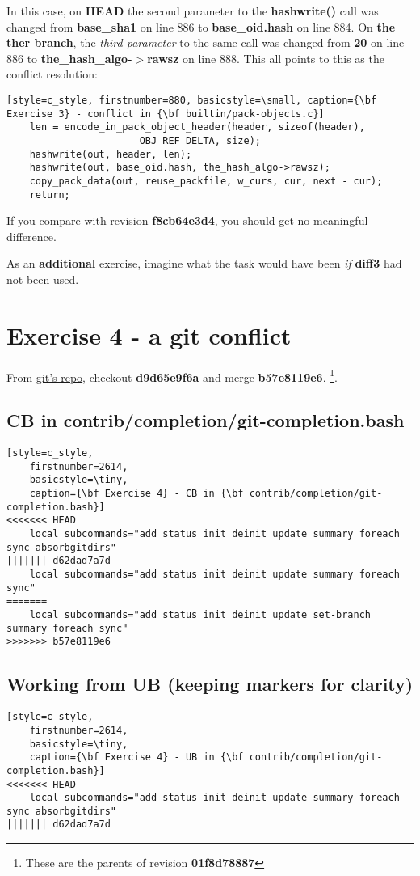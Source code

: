 In this case, on {\bf HEAD} the second parameter to the {\bf hashwrite()} call was changed from {\bf base\_sha1} on
line 886 to {\bf base\_oid.hash} on line 884. On {\bf the ther branch}, the {\it third parameter} to the same call was
changed from {\bf 20} on line 886 to {\bf the\_hash\_algo-$>$rawsz} on line 888. This all points to this as the conflict
resolution:

\begin{lstlisting}[style=c_style, firstnumber=880, basicstyle=\small, caption={\bf Exercise 3} - conflict in {\bf builtin/pack-objects.c}]
	len = encode_in_pack_object_header(header, sizeof(header),
					   OBJ_REF_DELTA, size);
	hashwrite(out, header, len);
	hashwrite(out, base_oid.hash, the_hash_algo->rawsz);
	copy_pack_data(out, reuse_packfile, w_curs, cur, next - cur);
	return;
\end{lstlisting}

If you compare with revision {\bf f8cb64e3d4}, you should get no meaningful difference.

As an {\bf additional} exercise, imagine what the task would have been {\it if} {\bf diff3} had not been used.

\section{Exercise 4 - a git conflict}
\label{exercise_04}
From \hyperref[git_repo]{git's repo}, checkout {\bf d9d65e9f6a} and merge {\bf b57e8119e6}.
\footnote{These are the parents of revision {\bf 01f8d78887}}.

\subsection*{CB in contrib/completion/git-completion.bash}
\begin{lstlisting}[style=c_style,
	firstnumber=2614,
	basicstyle=\tiny,
	caption={\bf Exercise 4} - CB in {\bf contrib/completion/git-completion.bash}]
<<<<<<< HEAD
	local subcommands="add status init deinit update summary foreach sync absorbgitdirs"
||||||| d62dad7a7d
	local subcommands="add status init deinit update summary foreach sync"
=======
	local subcommands="add status init deinit update set-branch summary foreach sync"
>>>>>>> b57e8119e6
\end{lstlisting}

\subsection*{Working from {\bf UB} (keeping markers for clarity)}
\begin{lstlisting}[style=c_style,
	firstnumber=2614,
	basicstyle=\tiny,
	caption={\bf Exercise 4} - UB in {\bf contrib/completion/git-completion.bash}]
<<<<<<< HEAD
	local subcommands="add status init deinit update summary foreach sync absorbgitdirs"
||||||| d62dad7a7d
\end{lstlisting}

